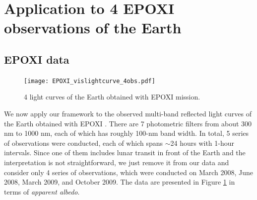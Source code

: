 \documentclass[iop,numberedappendix,apj,]{emulateapj}
\def\fast{\tilde f}
\begin{document}




\clearpage

\acknowledgments



\newpage

\appendix

\section{Application to 4 EPOXI observations of the Earth}
\label{s:epoxi}

\subsection{EPOXI data}
\label{ss:epoxidata}

\begin{figure}[b!]
    \begin{center}
\texttt{[image: EPOXI\_vislightcurve\_4obs.pdf]}
    \end{center}
    \caption{4 light curves of the Earth obtained with EPOXI mission.}
\label{fig:EPOXIlc}
\end{figure}

We now apply our framework to the observed multi-band reflected light curves of the Earth obtained with EPOXI \citep{Livengood2011, Cowan2011}. 
There are 7 photometric filters from about 300 nm to 1000 nm, each of which has roughly 100-nm band width. 
In total, 5 series of observations were conducted, each of which spans $\sim $24 hours with 1-hour intervals. 
Since one of them includes lunar transit in front of the Earth and the interpretation is not straightforward, we just remove it from our data and consider only 4 series of observations, which were conducted on March 2008, June 2008, March 2009, and October 2009. 
The data are presented in Figure \ref{fig:EPOXIlc} in terms of {\it apparent albedo}. 
\end{document}
